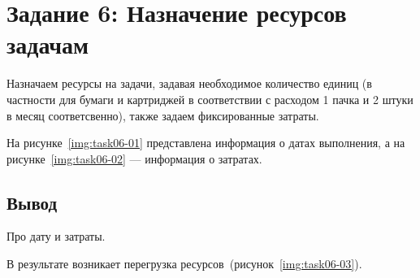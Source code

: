 \section{Задание 6: Назначение ресурсов задачам}

Назначаем ресурсы на задачи, задавая необходимое количество единиц (в частности
для бумаги и картриджей в соответствии с расходом 1 пачка и 2 штуки в месяц
соответсвенно), также задаем фиксированные затраты.

На рисунке~\ref{img:task06-01} представлена информация о датах выполнения, а на
рисунке~\ref{img:task06-02} --- информация о затратах.



\subsection*{Вывод}

Про дату и затраты.

В результате возникает перегрузка ресурсов~(рисунок~\ref{img:task06-03}).

